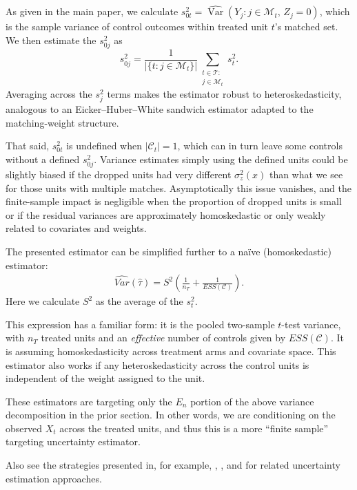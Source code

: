 \documentclass[11pt]{article}
\newcommand{\Ct}{\mathcal{C}_t}
\begin{document}
As given in the main paper, we calculate $s_{0t}^2 = \widehat{\operatorname{Var}}(Y_{j} : j\in\mathcal{M}_t,\, Z_j=0)$, which is the sample variance of control outcomes within treated unit $t$'s matched set.
We then estimate the $s_{0j}^2$ as
\[  
s_{0j}^2 = \frac{1}{\lvert\{t : j\in\mathcal{M}_t\}\rvert}
    \sum_{\substack{t\in\mathcal{T}: \\ j\in\mathcal{M}_t}} s_t^2 .
\]
Averaging across the $s_j^2$ terms makes the estimator robust to heteroskedasticity, analogous to an Eicker--Huber--White sandwich estimator adapted to the matching-weight structure.

That said, $s_{0t}^2$ is undefined when $|\Ct|=1$, which can in turn leave some controls without a defined $s_{0j}^2$.
Variance estimates simply using the defined units could be slightly biased if the dropped units had very different $\sigma^2_z(x)$ than what we see for those units with multiple matches.
Asymptotically this issue vanishes, and the finite-sample impact is negligible when the proportion of dropped units is small or if the residual variances are approximately homoskedastic or only weakly related to covariates and weights.


The presented estimator can be simplified further to a na\"ive (homoskedastic) estimator:
 \begin{align}
 \label{eq:plug-in-variance-estimator-naive}
     \widehat{Var}(\hat{\tau})
     = S^2 \left( \frac{1}{n_T} + \frac{1}{ESS(\mathcal{C})} \right).
 \end{align}
Here we calculate $S^2$ as the average of the $s_t^2$.

This expression has a familiar form: it is the pooled two-sample $t$-test variance, with $n_T$ treated units and an \emph{effective} number of controls given by $ESS(\mathcal{C})$.
It is assuming homoskedasticity across treatment arms and covariate space.
This estimator also works if any heteroskedasticity across the control units is independent of the weight assigned to the unit.

These estimators are targeting only the $E_n$ portion of the above variance decomposition in the prior section.
In other words, we are conditioning on the observed $X_t$ across the treated units, and thus this is a more ``finite sample'' targeting uncertainty estimator.

Also see the strategies presented in, for example, \citet{ben2021augmented}, \citet{keele2023hospital}, and \citet{lu2023you} for related uncertainty estimation approaches.
\end{document}

